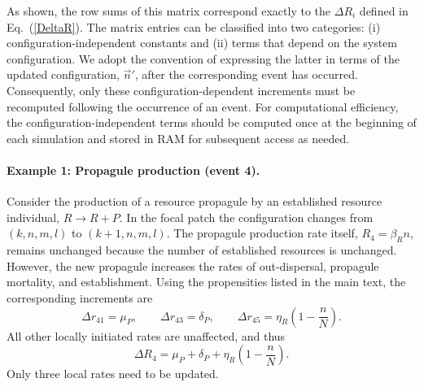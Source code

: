 
As shown, the row sums of this matrix correspond exactly to the $\Delta R_i$ defined in Eq.~(\ref{DeltaR}). The matrix entries can be classified into two categories: (i) configuration-independent constants and (ii) terms that depend on the system configuration. We adopt the convention of expressing the latter in terms of the updated configuration, $\vec{n}'$, after the corresponding event has occurred. Consequently, only these configuration-dependent increments must be recomputed following the occurrence of an event. For computational efficiency, the configuration-independent terms should be computed once at the beginning of each simulation and stored in RAM for subsequent access as needed.

\paragraph{Example 1: Propagule production (event 4).}
Consider the production of a resource propagule by an established resource individual,
$R\rightarrow R+P$. In the focal patch the configuration changes from
$(k,n,m,l)$ to $(k+1,n,m,l)$. The propagule production rate itself,
$R_4=\beta_R n$, remains unchanged because the number of established
resources is unchanged. However, the new propagule increases the rates of
out-dispersal, propagule mortality, and establishment. Using the propensities
listed in the main text, the corresponding increments are
\begin{equation}
\Delta r_{41}=\mu_P,\qquad
\Delta r_{43}=\delta_P,\qquad
\Delta r_{45}=\eta_R\left(1-\frac{n}{N}\right).
\end{equation}
All other locally initiated rates are unaffected, and thus
\begin{equation}
\boxed{\Delta R_4=\mu_P+\delta_P+\eta_R\left(1-\frac{n}{N}\right).}
\label{eq:delta_R_production}
\end{equation}
Only three local rates need to be updated.

